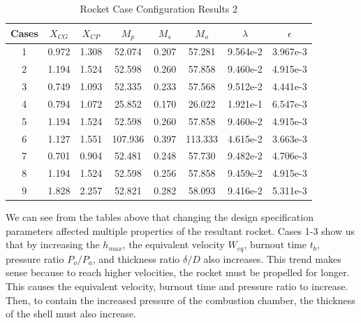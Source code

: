 \documentclass{report}
\begin{document}
\begin{table}[h!]
    \centering
    \caption{Rocket Case Configuration Results 2}
    \begin{tabular}{|c|c|c|c|c|c|c|c|}
        \hline
        \textbf{Cases} & $X_{CG}$ & $X_{CP}$ & $M_p$ & \textbf{$M_s$} & \textbf{$M_o$} & \textbf{$\lambda$} & \textbf{$\epsilon$} \\
        \hline
        1 & 0.972 & 1.308 & 52.074 & 0.207 & 57.281 & 9.564e-2 & 3.967e-3 \\
        2 & 1.194 & 1.524 & 52.598 & 0.260 & 57.858 & 9.460e-2 & 4.915e-3 \\
        3 & 0.749 & 1.093 & 52.335 & 0.233 & 57.568 & 9.512e-2 & 4.441e-3 \\
        \hline
        4 & 0.794 & 1.072 & 25.852 & 0.170 & 26.022 & 1.921e-1 & 6.547e-3 \\
        5 & 1.194 & 1.524 & 52.598 & 0.260 & 57.858 & 9.460e-2 & 4.915e-3 \\
        6 & 1.127 & 1.551 & 107.936 & 0.397 & 113.333 & 4.615e-2 & 3.663e-3 \\
        \hline
        7 & 0.701 & 0.904 & 52.481 & 0.248 & 57.730 & 9.482e-2 & 4.706e-3 \\
        8 & 1.194 & 1.524 & 52.598 & 0.256 & 57.858 & 9.459e-2 & 4.915e-3 \\
        9 & 1.828 & 2.257 & 52.821 & 0.282 & 58.093 & 9.416e-2 & 5.311e-3 \\
        \hline
    \end{tabular}
    \label{table:caseresult2}
\end{table}

\noindent We can see from the tables above that changing the design specification parameters affected multiple properties of the resultant rocket.
Cases 1-3 show us that by increasing the $h_{max}$, the equivalent velocity $W_{eq}$, burnout time $t_b$, pressure ratio $P_o/P_a$, and thickness ratio $\delta/D$ also increases.
This trend makes sense because to reach higher velocities, the rocket must be propelled for longer.
This causes the equivalent velocity, burnout time and pressure ratio to increase.
Then, to contain the increased pressure of the combustion chamber, the thickness of the shell must also increase.\\
\end{document}
